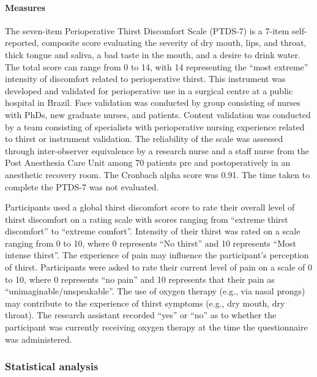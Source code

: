 \documentclass[letterpaper,9pt,twocolumn,twoside,]{pinp}
\begin{document}
\hypertarget{measures}{%
\paragraph{Measures}\label{measures}}

The seven-item Perioperative Thirst Discomfort Scale (PTDS-7) is a
7-item self-reported, composite score evaluating the severity of dry
mouth, lips, and throat, thick tongue and saliva, a bad taste in the
mouth, and a desire to drink water. The total score can range from 0 to
14, with 14 representing the ``most extreme'' intensity of discomfort
related to perioperative thirst. This instrument was developed and
validated for perioperative use in a surgical centre at a public
hospital in Brazil. Face validation was conducted by group consisting of
nurses with PhDs, new graduate nurses, and patients. Content validation
was conducted by a team consisting of specialists with perioperative
nursing experience related to thirst or instrument validation. The
reliability of the scale was assessed through inter-observer equivalence
by a research nurse and a staff nurse from the Post Anesthesia Care Unit
among 70 patients pre and postoperatively in an anesthetic recovery
room. The Cronbach alpha score was 0.91. The time taken to complete the
PTDS-7 was not evaluated.

Participants used a global thirst discomfort score to rate their overall
level of thirst discomfort on a rating scale with scores ranging from
``extreme thirst discomfort'' to ``extreme comfort''. Intensity of their
thirst was rated on a scale ranging from 0 to 10, where 0 represents
``No thirst'' and 10 represents ``Most intense thirst''. The experience
of pain may influence the participant's perception of
thirst.\citep{Pierotti_2018} Participants were asked to rate their
current level of pain on a scale of 0 to 10, where 0 represents ``no
pain'' and 10 represents that their pain as
``unimaginable/unspeakable''. The use of oxygen therapy (e.g., via nasal
prongs) may contribute to the experience of thirst symptoms (e.g., dry
mouth, dry throat).\citep{conchon2015perioperative} The research
assistant recorded ``yes'' or ``no'' as to whether the participant was
currently receiving oxygen therapy at the time the questionnaire was
administered.

\hypertarget{statistical-analysis}{%
\subsubsection{Statistical analysis}\label{statistical-analysis}}
\end{document}
